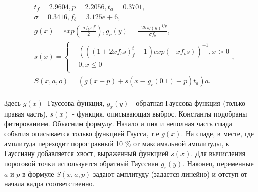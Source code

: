 \documentclass[a4paper,14pt]{extreport}
\begin{document}
\begin{equation}\label{eq:shape_formula}
    \begin{split}
    & t_f = 2.9604, p = 2.2056, t_a = 0.3701, \\
    & \sigma = 0.3416, f_b = 3.125e+6, \\
    & g(x) = exp(\frac{|\sigma f_b x|^p}{2}), g_r(y) = \frac{-2 log(y)^{1/p}}{\sigma f_b}, \\
    & s(x) = \begin{cases}
    & (((1 + 2 x f_b s)^t_f - 1)  exp(-x f_b s))^{-1}, x > 0 \\
    & 0, x \leq 0 \\
    & \end{cases}, \\
    & S(x, a, o) = (g(x - p) + s(x - g_r(0.1) - p) t_a ) a. \\
    \end{split}
\end{equation}

Здесь $g(x)$- Гауссова функция, $ g_r(y) $ - обратная Гауссова функция (только правая часть), $ s(x) $ - функция, описывающая выброс. Константы подобраны фитированием. Объясним формулу. Начало и пик и неполная часть спада события описывается только функцией Гаусса, т.е $g(x)$. На спаде, в месте, где амплитуда переходит порог равный 10 \% от максимальной амплитуды, к Гауссиану добавляется хвост, выраженный функцией $ s(x) $. Для вычисления пороговой точки используется обратный Гауссиан $ g_r(y) $. Наконец, переменные $ a $ и $ p $ в формуле $ S(x,a,p) $ задают амплитуду (задается линейно) и отступ от начала кадра соответственно.
\end{document}
